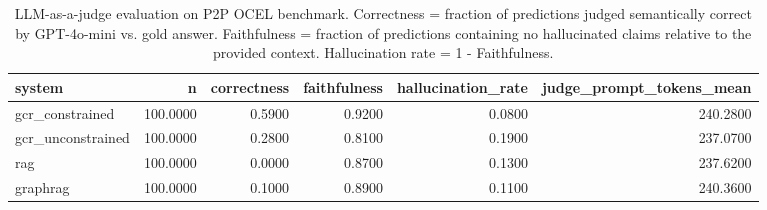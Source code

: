 \begin{table}
\caption{LLM-as-a-judge evaluation on P2P OCEL benchmark. Correctness = fraction of predictions judged semantically correct by GPT-4o-mini vs. gold answer. Faithfulness = fraction of predictions containing no hallucinated claims relative to the provided context. Hallucination rate = 1 - Faithfulness.}
\label{tab:judge_results}
\begin{tabular}{lrrrrr}
\toprule
system & n & correctness & faithfulness & hallucination_rate & judge_prompt_tokens_mean \\
\midrule
gcr_constrained & 100.0000 & 0.5900 & 0.9200 & 0.0800 & 240.2800 \\
gcr_unconstrained & 100.0000 & 0.2800 & 0.8100 & 0.1900 & 237.0700 \\
rag & 100.0000 & 0.0000 & 0.8700 & 0.1300 & 237.6200 \\
graphrag & 100.0000 & 0.1000 & 0.8900 & 0.1100 & 240.3600 \\
\bottomrule
\end{tabular}
\end{table}
